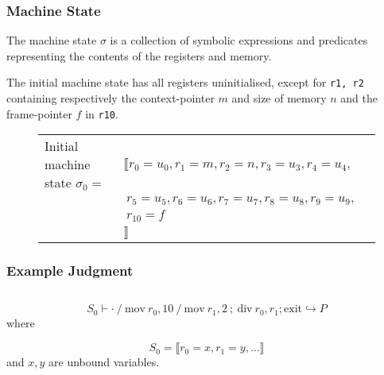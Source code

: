 \subsubsection{Machine State}


The machine state $\sigma$ is a collection of symbolic expressions and predicates representing the contents of the registers and memory. 

The initial machine state has all registers uninitialised, except for \texttt{r1, r2} containing  respectively the context-pointer $m$ and size of memory $n$ and the frame-pointer $f$ in \texttt{r10}.

\begin{figure}[ht]
  \centering
  \begin{tabular}{lll}
    Initial machine state $\sigma_0=$ & $ \llbracket r_0=u_0, r_1=m, r_2 = n, r_3=u_3, r_4=u_4,$ \\
                                      & $~ r_5=u_5, r_6=u_6, r_7=u_7, r_8=u_8, r_9=u_9,$ \\
    & $ ~  r_{10}=f$ \\
    & $\rrbracket $ \\
\end{tabular}    
\end{figure}



\subsubsection{Example Judgment}

\inputminted{text}{design/example_judgment.ebpf}

$$S_0 \vdash \cdot ~ / ~ \mathrm{mov} ~ r_0, 10 ~ / ~ \mathrm{mov} ~ r_1, 2 ~ ; ~ \mathrm{div} ~ r_0, r_1 ; \mathrm{exit} \hookrightarrow P$$
where

$$S_0 = \llbracket r_0 = x, r_1 = y, \dots \rrbracket$$
and $x, y$ are unbound variables.

\begin{prooftree}
\end{prooftree}

\begin{prooftree}
\end{prooftree}


